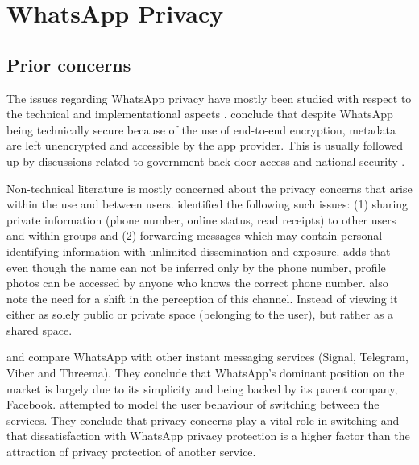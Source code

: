 
\section{WhatsApp Privacy} \label{sec:whatsapp}

\subsection{Prior concerns} \label{subsec:whatsapp_prior}

The issues regarding WhatsApp privacy have mostly been studied with respect to the technical and implementational aspects \citep{terpstra2013whatsapp,carpay2019whatsapp,abiodun2020reinforcing}.
\citet{rastogi2017whatsapp} conclude that despite WhatsApp being technically secure because of the use of end-to-end encryption, metadata are left unencrypted and accessible by the app provider.
This is usually followed up by discussions related to government back-door access and national security \citep{endeley2018end}.

Non-technical literature is mostly concerned about the privacy concerns that arise within the use and between users.
\citet{santos2020analyzing} identified the following such issues: (1) sharing private information (phone number, online status, read receipts) to other users and within groups and (2) forwarding messages which may contain personal identifying information with unlimited dissemination and exposure.
\citet{terpstra2013whatsapp} adds that even though the name can not be inferred only by the phone number, profile photos can be accessed by anyone who knows the correct phone number.
\citet{santos2020analyzing} also note the need for a shift in the perception of this channel.
Instead of viewing it either as solely public or private space (belonging to the user), but rather as a shared space.

\citet{sutikno2016whatsapp} and \citet{rosler2018more} compare WhatsApp with other instant messaging services (Signal, Telegram, Viber and Threema).
They conclude that WhatsApp's dominant position on the market is largely due to its simplicity and being backed by its parent company, Facebook.
\citet{schreiner2015examining} attempted to model the user behaviour of switching between the services.
They conclude that privacy concerns play a vital role in switching and that dissatisfaction with WhatsApp privacy protection is a higher factor than the attraction of privacy protection of another service.

